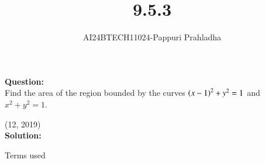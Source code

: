 \documentclass[journal]{IEEEtran}
\begin{document}

\vspace{3cm}

\title{9.5.3}
\author{AI24BTECH11024-Pappuri Prahladha}
{\let\newpage\relax\maketitle}

\renewcommand{\thefigure}{\theenumi}
\renewcommand{\thetable}{\theenumi}
\setlength{\intextsep}{10pt} %


\renewcommand{\thetable}{\theenumi}


\textbf{Question:}\\
Find the area of the region bounded by the curves $\left(x-1\right)^{2} +y^{2} = 1$ and $ x^{2}+y^{2}  = 1$. 

\hfill (12, 2019)
\\
\textbf{Solution: }\\
\begin{table}[h!]
    \renewcommand{\thetable}{1}
    \centering
    
    \caption{Terms used}
    \label{TABLE 1:}
\end{table}\\
\end{document}
